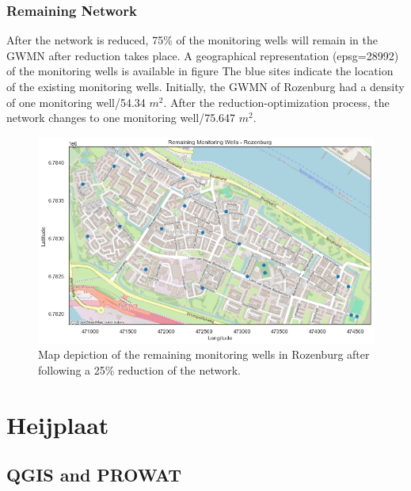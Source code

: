\clearpage

\subsubsection{Remaining Network}
After the network is reduced, 75\% of the monitoring wells will remain in the GWMN after reduction takes place. A geographical representation (epsg=28992) of the monitoring wells is available in figure  The blue sites indicate the location of the existing monitoring wells. Initially, the GWMN of Rozenburg had a density of one monitoring well/54.34 $m^2$. After the reduction-optimization process, the network changes to one monitoring well/75.647 $m^2$. 

\begin{figure}[htbp]
    \centering
    \includegraphics[width=1\linewidth]{frontmatter/Rozenburg-fig/After.png}
    \caption{Map depiction of the remaining monitoring wells in Rozenburg after following a 25\% reduction of the network. }
    \label{afterroz}
    
\end{figure}

\clearpage

\section{Heijplaat}
\subsection{QGIS and PROWAT}

